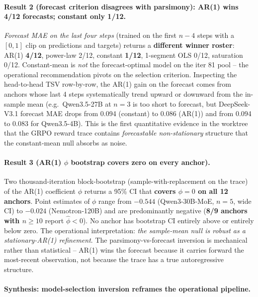 \paragraph{Result 2 (forecast criterion disagrees with parsimony):
AR(1) wins 4/12 forecasts; constant only 1/12.}
\label{par:scaling-iter93-forecast}

\emph{Forecast MAE on the last four steps} (trained on the first
$n-4$ steps with a $[0,1]$ clip on predictions and targets) returns a
\textbf{different winner roster}: AR(1) \textbf{4/12}, power-law 2/12,
constant \textbf{1/12}, 1-segment OLS 0/12, saturation 0/12.
Constant-mean is \emph{not} the forecast-optimal model on the iter 81
pool -- the operational recommendation pivots on the selection
criterion.  Inspecting the head-to-head TSV row-by-row, the AR(1) gain
on the forecast comes from anchors whose last 4 steps systematically
trend upward or downward from the in-sample mean (e.g.\ Qwen3.5-27B at
$n=3$ is too short to forecast, but DeepSeek-V3.1 forecast MAE drops
from 0.094 (constant) to 0.086 (AR(1)) and from 0.094 to 0.083 for
Qwen3.5-4B).  This is the first quantitative evidence in the
worktree that the GRPO reward trace contains \emph{forecastable
non-stationary} structure that the constant-mean null absorbs as noise.

\paragraph{Result 3 (AR(1) $\phi$ bootstrap covers zero on every
anchor).}
\label{par:scaling-iter93-ar1-ci}

Two thousand-iteration block-bootstrap (sample-with-replacement on the
trace) of the AR(1) coefficient $\phi$ returns a 95\% CI that
\textbf{covers $\phi=0$ on all 12 anchors}.  Point estimates of
$\phi$ range from $-0.544$ (Qwen3-30B-MoE, $n=5$, wide CI) to
$-0.024$ (Nemotron-120B) and are predominantly negative
(\textbf{8/9 anchors with $n\ge 10$} report $\hat\phi<0$).  No anchor
has bootstrap CI entirely above or entirely below zero.  The
operational interpretation: \emph{the sample-mean null is robust as a
stationary-AR(1) refinement}.  The parsimony-vs-forecast inversion is
mechanical rather than statistical -- AR(1) wins the forecast because
it carries forward the most-recent observation, not because the trace
has a true autoregressive structure.

\paragraph{Synthesis: model-selection inversion reframes the
operational pipeline.}
\label{par:scaling-iter93-synthesis}

